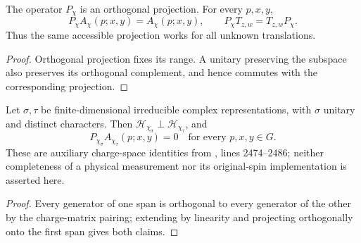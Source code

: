 \begin{lemma}
    \label{thm:peps_regular_charge_detector}
    \leanok
    The operator $P_\chi$ is an orthogonal projection. For every $p,x,y$,
    \[
        P_\chi A_\chi(p;x,y)=A_\chi(p;x,y),
        \qquad P_\chi T_{z,w}=T_{z,w}P_\chi.
    \]
    Thus the same accessible projection works for all unknown translations.
\end{lemma}
\begin{proof}\leanok
    Orthogonal projection fixes its range. A unitary preserving the subspace
    also preserves its orthogonal complement, and hence commutes with the
    corresponding projection.
\end{proof}

\begin{lemma}
    \label{thm:peps_regular_charge_subspace_orthogonality}
    \leanok
    Let $\sigma,\tau$ be finite-dimensional irreducible complex
    representations, with $\sigma$ unitary and distinct characters.
    Then $\mathcal H_{\chi_\sigma}\perp\mathcal H_{\chi_\tau}$, and
    \[
        P_{\chi_\sigma}A_{\chi_\tau}(p;x,y)=0
        \quad\text{for every }p,x,y\in G.
    \]
    These are auxiliary charge-space identities from
    \cite[charge detection]{Schuch2010PEPS}, lines 2474--2486;
    neither completeness of a physical measurement nor its original-spin
    implementation is asserted here.
\end{lemma}
\begin{proof}\leanok
    Every generator of one span is orthogonal to every generator of the
    other by the charge-matrix pairing; extending by linearity and
    projecting orthogonally onto the first span gives both claims.
\end{proof}

